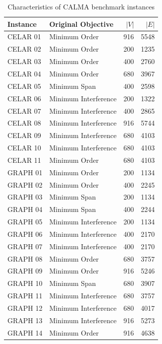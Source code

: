 \documentclass[letterpaper,journal]{IEEEtran}
\begin{document}
\begin{table}[ht]
\centering
\caption{Characteristics of CALMA benchmark instances}
\label{tab:calma}
\begin{tabular}{l l r r}
\hline
\textbf{Instance} & \textbf{Original Objective} & $|V|$ & $|E|$ \\
\hline
CELAR 01 & Minimum Order        & 916 & 5548 \\
CELAR 02 & Minimum Order        & 200 & 1235 \\
CELAR 03 & Minimum Order        & 400 & 2760 \\
CELAR 04 & Minimum Order        & 680 & 3967 \\
CELAR 05 & Minimum Span         & 400 & 2598 \\
CELAR 06 & Minimum Interference & 200 & 1322 \\
CELAR 07 & Minimum Interference & 400 & 2865 \\
CELAR 08 & Minimum Interference & 916 & 5744 \\
CELAR 09 & Minimum Interference & 680 & 4103 \\
CELAR 10 & Minimum Interference & 680 & 4103 \\
CELAR 11 & Minimum Order        & 680 & 4103 \\
GRAPH 01 & Minimum Order        & 200 & 1134 \\
GRAPH 02 & Minimum Order        & 400 & 2245 \\
GRAPH 03 & Minimum Span         & 200 & 1134 \\
GRAPH 04 & Minimum Span         & 400 & 2244 \\
GRAPH 05 & Minimum Interference & 200 & 1134 \\
GRAPH 06 & Minimum Interference & 400 & 2170 \\
GRAPH 07 & Minimum Interference & 400 & 2170 \\
GRAPH 08 & Minimum Order        & 680 & 3757 \\
GRAPH 09 & Minimum Order        & 916 & 5246 \\
GRAPH 10 & Minimum Span         & 680 & 3907 \\
GRAPH 11 & Minimum Interference & 680 & 3757 \\
GRAPH 12 & Minimum Interference & 680 & 4017 \\
GRAPH 13 & Minimum Interference & 916 & 5273 \\
GRAPH 14 & Minimum Order        & 916 & 4638 \\
\hline
\end{tabular}
\end{table}
\end{document}
